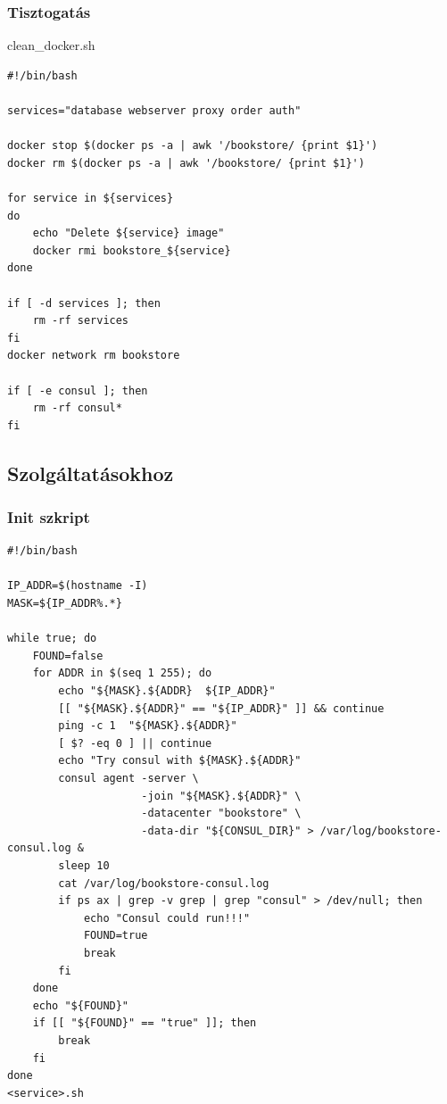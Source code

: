 \documentclass[11pt,magyar,a4paper,twoside,]{report}
\begin{document}
\subsubsection{\texorpdfstring{Tisztogatás\label{appendix-cleanup}}{Tisztogatás}}\label{tisztogatuxe1s}

clean\_docker.sh

\begin{verbatim}
#!/bin/bash

services="database webserver proxy order auth"

docker stop $(docker ps -a | awk '/bookstore/ {print $1}')
docker rm $(docker ps -a | awk '/bookstore/ {print $1}')

for service in ${services}
do
    echo "Delete ${service} image"
    docker rmi bookstore_${service}
done

if [ -d services ]; then
    rm -rf services
fi
docker network rm bookstore

if [ -e consul ]; then
    rm -rf consul*
fi
\end{verbatim}

\subsection{Szolgáltatásokhoz}\label{szolguxe1ltatuxe1sokhoz}

\subsubsection{\texorpdfstring{Init
szkript\label{appendix-starter}}{Init szkript}}\label{init-szkript}

\begin{verbatim}
#!/bin/bash

IP_ADDR=$(hostname -I)
MASK=${IP_ADDR%.*}

while true; do
    FOUND=false
    for ADDR in $(seq 1 255); do
        echo "${MASK}.${ADDR}  ${IP_ADDR}"
        [[ "${MASK}.${ADDR}" == "${IP_ADDR}" ]] && continue
        ping -c 1  "${MASK}.${ADDR}"
        [ $? -eq 0 ] || continue
        echo "Try consul with ${MASK}.${ADDR}"
        consul agent -server \
                     -join "${MASK}.${ADDR}" \
                     -datacenter "bookstore" \
                     -data-dir "${CONSUL_DIR}" > /var/log/bookstore-consul.log &
        sleep 10
        cat /var/log/bookstore-consul.log
        if ps ax | grep -v grep | grep "consul" > /dev/null; then
            echo "Consul could run!!!"
            FOUND=true
            break
        fi
    done
    echo "${FOUND}"
    if [[ "${FOUND}" == "true" ]]; then
        break
    fi
done
<service>.sh
\end{verbatim}
\end{document}
